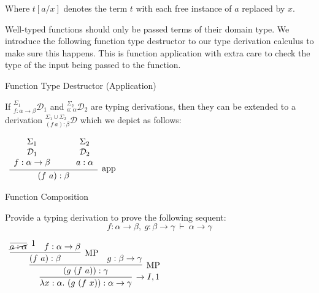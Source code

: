 \documentclass{book}
\begin{document}
            Where $t[a/x]$ denotes the term $t$ with each free instance of $a$ replaced by $x$. 
        
    
            Well-typed functions should only be passed terms of their domain type. We introduce the following function type destructor to our type derivation calculus to make sure this happens. This is function application with extra care to check the type of the input being passed to the function. 
        
        {Function Type Destructor (Application)}
    
            If $^{\Sigma_{1}}_{f : \alpha \rightarrow \beta}\mathcal{D}_{1}$ and $^{\Sigma_{2}}_{a : \alpha}\mathcal{D}_{2}$ are typing derivations, then they can be extended to a derivation $^{\Sigma_{1}\cup \Sigma_{2}}_{(f \ a) : \beta}\mathcal{D}$ which we depict as follows: 
    
            \begin{center}
                $\begin{array}{c}		
                    \infer[\app]{(f \ a) : \beta}{\begin{array}{c} \Sigma_{1} \\ \mathcal{D}_{1} \\ f : \alpha \rightarrow \beta \end{array} \quad & \begin{array}{c} \Sigma_{2} \\ \mathcal{D}_{2} \\  a : \alpha \end{array}}	
                \end{array}$
            \end{center}
        
    
        \newpage
        \begin{eg}{Function Composition}
    
            Provide a typing derivation to prove the following sequent: $$f : \alpha \to \beta, \ g : \beta \to \gamma \ \vdash \ \alpha \to \gamma $$
        
            \begin{center}
                $\begin{array}{c}
                    \infer[\to I,1]{\lambda x : \alpha. \ (g \ (f \ x)) : \alpha \to \gamma}
                        {\infer[\MP]{(g \ (f \ a)) : \gamma}
                            {\infer[\MP]{(f \ a) : \beta}
                                {\infer[1]{\cancel{a : \alpha}}{} & f : \alpha \to \beta}
                            &
                            g : \beta \to \gamma}}
                \end{array}$
            \end{center}
    
        \end{eg}
\end{document}

